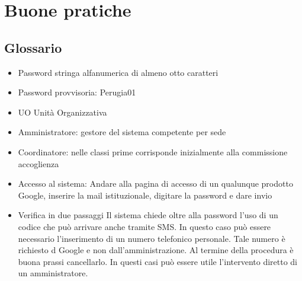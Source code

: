 \chapter{Buone pratiche}
\section{Glossario}
\begin{itemize}
	\item Password stringa alfanumerica di almeno otto caratteri
	\item Password provvisoria: Perugia01
	\item UO Unità Organizzativa
	\item Amministratore: gestore del sistema competente per sede
	\item Coordinatore: nelle classi prime corrisponde inizialmente alla commissione 
	accoglienza
	\item Accesso al sistema: Andare alla pagina di accesso di un qualunque 
	prodotto Google, inserire la mail istituzionale, digitare la password e 
	dare invio
	\item Verifica in due passaggi Il sistema chiede oltre alla password l'uso 
	di un codice che può arrivare anche tramite SMS. In questo caso può essere necessario
	l'inserimento di un numero telefonico personale. Tale numero è richiesto d Google e 
	non dall'amministrazione. Al termine della procedura è buona prassi 
	cancellarlo. In questi casi può essere utile l'intervento diretto di un 
	amministratore.
\end{itemize}
